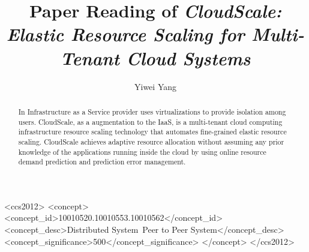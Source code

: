 \documentclass[acmlarge]{acmart}
\begin{document}
\title{Paper Reading of \textit{CloudScale: Elastic Resource Scaling for Multi-Tenant Cloud Systems}}

\author{Yiwei Yang}

\renewcommand{\shortauthors}{Yiwei Yang}

\begin{abstract}
  In Infrastructure as a Service provider uses virtualizations to provide isolation among users. CloudScale, as a augmentation to the IaaS, is a multi-tenant cloud computing infrastructure resource scaling technology that automates fine-grained elastic resource scaling. CloudScale achieves adaptive resource allocation without assuming any prior knowledge of the applications running inside the cloud by using online resource demand prediction and prediction error management.
\end{abstract}
\begin{CCSXML}
  <ccs2012>
  <concept>
  <concept_id>10010520.10010553.10010562</concept_id>
  <concept_desc>Distributed System~Peer to Peer System</concept_desc>
  <concept_significance>500</concept_significance>
  </concept>
  </ccs2012>
\end{CCSXML}


\keywords{}
\end{document}
